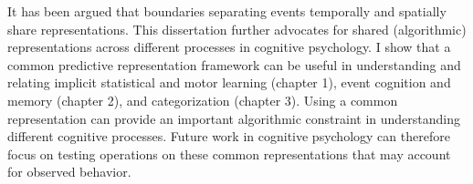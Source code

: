 It has been argued that boundaries separating events temporally and spatially share representations. This dissertation further advocates for shared (algorithmic) representations across different processes in cognitive psychology. I show that a common predictive representation framework can be useful in understanding and relating implicit statistical and motor learning (chapter 1), event cognition and memory (chapter 2), and categorization (chapter 3). Using a common representation can provide an important algorithmic constraint in understanding different cognitive processes. Future work in cognitive psychology can therefore focus on testing operations on these common representations that may account for observed behavior.

\appendix






	



